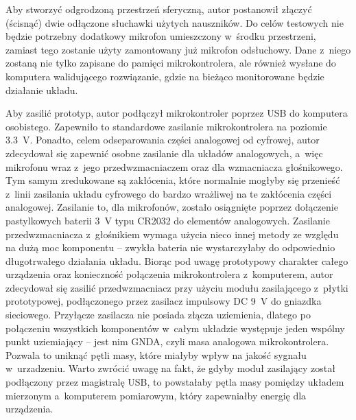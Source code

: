 Aby stworzyć odgrodzoną przestrzeń sferyczną, autor postanowił złączyć (ścisnąć) dwie odłączone słuchawki użytych nauszników. Do celów testowych nie będzie potrzebny dodatkowy mikrofon umieszczony w~środku przestrzeni, zamiast tego zostanie użyty zamontowany już mikrofon odsłuchowy. Dane z~niego zostaną nie tylko zapisane do pamięci mikrokontrolera, ale również wysłane do komputera walidującego rozwiązanie, gdzie na bieżąco monitorowane będzie działanie układu.

Aby zasilić prototyp, autor podłączył mikrokontroler poprzez USB do komputera osobistego. Zapewniło to standardowe zasilanie mikrokontrolera na poziomie \SI{3.3}{\V}. Ponadto, celem odseparowania części analogowej od cyfrowej, autor zdecydował się zapewnić osobne zasilanie dla układów analogowych, a~więc mikrofonu wraz z~jego przedwzmacniaczem oraz dla wzmacniacza głośnikowego. Tym samym zredukowane są zakłócenia, które normalnie mogłyby się przenieść z~linii zasilania układu cyfrowego do bardzo wrażliwej na te zakłócenia części analogowej. Zasilanie to, dla mikrofonów, zostało osiągnięte poprzez dołączenie pastylkowych baterii \SI{3}{\V} typu CR2032 do elementów analogowych. Zasilanie przedwzmacniacza z~głośnikiem wymaga użycia nieco innej metody ze względu na dużą moc komponentu -- zwykła bateria nie wystarczyłaby do odpowiednio długotrwałego działania układu. Biorąc pod uwagę prototypowy charakter całego urządzenia oraz konieczność połączenia mikrokontrolera z~komputerem, autor zdecydował się zasilić przedwzmacniacz przy użyciu modułu zasilającego z~płytki prototypowej, podłączonego przez zasilacz impulsowy DC \SI{9}{\V} do gniazdka sieciowego. Przyłącze zasilacza nie posiada złącza uziemienia, dlatego po połączeniu wszystkich komponentów w~całym układzie występuje jeden wspólny punkt uziemiający -- jest nim GNDA, czyli masa analogowa mikrokontrolera. Pozwala to uniknąć pętli masy, które miałyby wpływ na jakość sygnału w~urzadzeniu. Warto zwrócić uwagę na fakt, że gdyby moduł zasilający został podłączony przez magistralę USB, to powstałaby pętla masy pomiędzy układem mierzonym a~komputerem pomiarowym, który zapewniałby energię dla urządzenia.